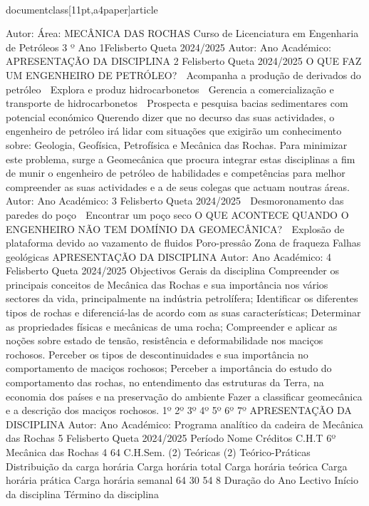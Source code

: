 \\documentclass[11pt,a4paper]{article}
\begin{document}

Autor:
Área:
MECÂNICA DAS ROCHAS
Curso de Licenciatura em Engenharia de Petróleos
3 º Ano
1Felisberto Queta
2024/2025
Autor:
Ano Académico:
APRESENTAÇÃO DA DISCIPLINA 2
Felisberto Queta
2024/2025
O QUE FAZ UM ENGENHEIRO DE PETRÓLEO? 
 Acompanha 
a produção de derivados 
do petróleo
 Explora e produz 
hidrocarbonetos
 Gerencia a  comercialização 
e transporte de 
hidrocarbonetos
 Prospecta e pesquisa 
bacias sedimentares com 
potencial económico
Querendo dizer que no decurso das suas
actividades, o engenheiro de petróleo irá lidar
com situações que exigirão um conhecimento
sobre:
Geologia, Geofísica, Petrofísica e
Mecânica das Rochas.
Para minimizar este problema, surge a
Geomecânica que procura integrar estas
disciplinas a fim de munir o engenheiro de
petróleo de habilidades e competências para
melhor compreender as suas actividades e a
de seus colegas que actuam noutras áreas.
Autor:
Ano Académico:
3
Felisberto Queta
2024/2025
 Desmoronamento das paredes do poço
 Encontrar um poço seco
O QUE ACONTECE QUANDO O ENGENHEIRO NÃO TEM DOMÍNIO DA GEOMECÂNICA? 
 Explosão de plataforma devido ao 
vazamento de fluidos
Poro-pressâo Zona de 
fraqueza
Falhas 
geológicas
APRESENTAÇÃO DA DISCIPLINA
Autor:
Ano Académico:
4
Felisberto Queta
2024/2025
Objectivos Gerais da disciplina
Compreender os principais conceitos de Mecânica das Rochas e sua importância nos 
vários sectores da vida, principalmente na indústria petrolífera;
Identificar os diferentes tipos de rochas e diferenciá-las de acordo com as suas 
características;
Determinar as propriedades físicas e mecânicas de uma rocha;
Compreender e aplicar as noções sobre estado de tensão,  resistência e 
deformabilidade nos maciços rochosos. 
Perceber os tipos de descontinuidades e sua importância no comportamento de 
maciços rochosos; 
Perceber a importância do estudo do comportamento das rochas, no entendimento 
das estruturas da Terra, na economia dos países e na preservação do ambiente
Fazer a classificar geomecânica e a descrição dos maciços rochosos.
1º
2º
3º
4º
5º
6º
7º
APRESENTAÇÃO DA DISCIPLINA
Autor:
Ano Académico:
Programa analítico da cadeira de Mecânica das Rochas 5
Felisberto Queta
2024/2025
Período Nome Créditos C.H.T 
6º Mecânica das Rochas 4 64
C.H.Sem. (2) Teóricas (2) Teórico-Práticas 
Distribuição da carga horária
Carga horária total Carga horária teórica Carga horária prática Carga horária 
semanal 
64 30 54 8
Duração do Ano Lectivo
Início da disciplina Término da disciplina
\end{document}
